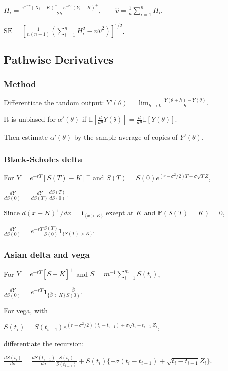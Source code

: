 $H_i=\frac{e^{-rT}(X_i-K)^+-e^{-rT}(Y_i-K)^+}{2h},\qquad \hat v=\frac1n\sum_{i=1}^nH_i$.

$\mathrm{SE}=\left[\frac{1}{n(n-1)}\left(\sum_{i=1}^nH_i^2-n\hat v^2\right)\right]^{1/2}$.

\subsection{Pathwise Derivatives}

\subsubsection*{Method}

Differentiate the random output:
$Y'(\theta)=\lim_{h\to0}\frac{Y(\theta+h)-Y(\theta)}{h}$.

It is unbiased for $\alpha'(\theta)$ if
$\mathbb{E}\left[\frac{d}{d\theta}Y(\theta)\right]=\frac{d}{d\theta}\mathbb{E}[Y(\theta)]$.

Then estimate $\alpha'(\theta)$ by the sample average of copies of $Y'(\theta)$.

\subsubsection*{Black-Scholes delta}

For $Y=e^{-rT}[S(T)-K]^+$ and $S(T)=S(0)e^{(r-\sigma^2/2)T+\sigma\sqrt TZ}$,

$\frac{dY}{dS(0)}=\frac{dY}{dS(T)}\frac{dS(T)}{dS(0)}$.

Since $d(x-K)^+/dx=\mathbf{1}_{\{x>K\}}$ except at $K$ and $\mathbb{P}(S(T)=K)=0$,

$\frac{dY}{dS(0)}=e^{-rT}\frac{S(T)}{S(0)}\mathbf{1}_{\{S(T)>K\}}$.

\subsubsection*{Asian delta and vega}

For $Y=e^{-rT}[\bar S-K]^+$ and $\bar S=m^{-1}\sum_{i=1}^mS(t_i)$,

$\frac{dY}{dS(0)}=e^{-rT}\mathbf{1}_{\{\bar S>K\}}\frac{\bar S}{S(0)}$.

For vega, with

$S(t_i)=S(t_{i-1})e^{(r-\sigma^2/2)(t_i-t_{i-1})+\sigma\sqrt{t_i-t_{i-1}}Z_i}$,

differentiate the recursion:

$\frac{dS(t_i)}{d\sigma}=\frac{dS(t_{i-1})}{d\sigma}\frac{S(t_i)}{S(t_{i-1})}+S(t_i)\{-\sigma(t_i-t_{i-1})+\sqrt{t_i-t_{i-1}}Z_i\}$.


